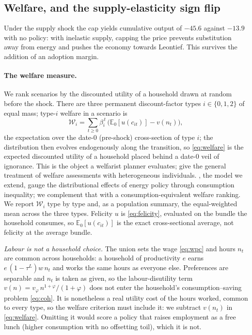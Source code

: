 

\subsection{Welfare, and the supply-elasticity sign flip}
\label{sec:welfare}

Under the supply shock the cap yields cumulative output of $-45.6$ against
$-13.9$ with no policy: with inelastic supply, capping the price prevents
substitution away from energy and pushes the economy towards Leontief. This
survives the addition of an adoption margin.



\paragraph{The welfare measure.} We rank scenarios by the discounted utility of a
household drawn at random before the shock. There are three permanent
discount-factor types $i\in\{0,1,2\}$ of equal mass; type-$i$ welfare in a scenario
is
%
\begin{equation}
  \mathcal{W}_i=\sum_{t\ge0}\beta_i^{\,t}\,\bigl(\mathbb{E}_0[u(c_{it})]-v(n_t)\bigr),
  \label{eq:welfare}
\end{equation}
%
the expectation over the date-$0$ (pre-shock) cross-section of type $i$; the
distribution then evolves endogenously along the transition, so \eqref{eq:welfare}
is the expected discounted utility of a household placed behind a date-$0$ veil of
ignorance. This is the object a welfarist planner evaluates; \citet{DavilaSchaab2025}
give the general treatment of welfare assessments with heterogeneous individuals.
\citet{ARS2024}, the model we extend, gauge the distributional effects of energy
policy through consumption inequality; we complement that with a
consumption-equivalent welfare ranking. We report $\mathcal{W}_i$ type by type and,
as a population summary, the equal-weighted mean across the three types. Felicity $u$
is \eqref{eq:felicity}, evaluated on the bundle the household consumes, so
$\mathbb{E}_0[u(c_{it})]$ is the exact cross-sectional average, not felicity at the
average bundle.

\emph{Labour is not a household choice.} The union sets the wage \eqref{eq:wpc} and
hours $n_t$ are common across households: a household of productivity $e$ earns
$e\,(1-\tau^L)w\,n_t$ and works the same hours as everyone else. Preferences are
separable and $n_t$ is taken as given, so the labour-disutility term
$v(n)=v_\varphi\,n^{1+\varphi}/(1+\varphi)$ does not enter the household's
consumption--saving problem \eqref{eq:coh}. It is nonetheless a real utility cost of
the hours worked, common to every type, so the welfare criterion must include it: we
subtract $v(n_t)$ in \eqref{eq:welfare}. Omitting it would score a policy that raises
employment as a free lunch (higher consumption with no offsetting toil), which it is
not.

